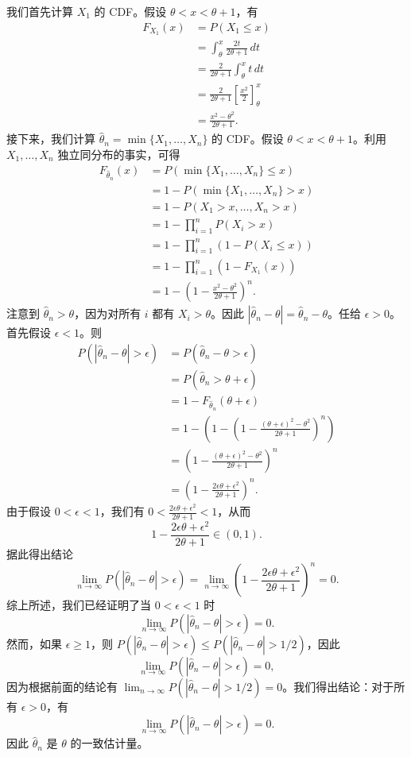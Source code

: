 \begin{questions}
\begin{solution}
我们首先计算 $X_1$ 的 CDF。假设 $\theta < x < \theta + 1$，有
\begin{align*}
F_{X_1}(x) &= P(X_1 \le x) \\
&= \int_{\theta}^x \frac{2t}{2\theta+1} \,dt \\
&= \frac{2}{2\theta+1} \int_{\theta}^x t \,dt \\
&= \frac{2}{2\theta+1} \left[\frac{x^2}{2}\right]_{\theta}^x \\
&= \frac{x^2 - \theta^2}{2\theta+1}.
\end{align*}
接下来，我们计算 $\hat{\theta}_n = \min\{X_1, \dots, X_n\}$ 的 CDF。假设 $\theta < x < \theta + 1$。利用 $X_1, \dots, X_n$ 独立同分布的事实，可得
\begin{align*}
F_{\hat{\theta}_n}(x) &= P(\min\{X_1, \dots, X_n\} \le x) \\
&= 1 - P(\min\{X_1, \dots, X_n\} > x) \\
&= 1 - P(X_1 > x, \dots, X_n > x) \\
&= 1 - \prod_{i=1}^n P(X_i > x) \\
&= 1 - \prod_{i=1}^n (1 - P(X_i \le x)) \\
&= 1 - \prod_{i=1}^n (1 - F_{X_1}(x)) \\
&= 1 - \left(1 - \frac{x^2 - \theta^2}{2\theta+1}\right)^n.
\end{align*}
注意到 $\hat{\theta}_n > \theta$，因为对所有 $i$ 都有 $X_i > \theta$。因此 $|\hat{\theta}_n - \theta| = \hat{\theta}_n - \theta$。任给 $\epsilon > 0$。首先假设 $\epsilon < 1$。则
\begin{align*}
P(|\hat{\theta}_n - \theta| > \epsilon) &= P(\hat{\theta}_n - \theta > \epsilon) \\
&= P(\hat{\theta}_n > \theta + \epsilon) \\
&= 1 - F_{\hat{\theta}_n}(\theta + \epsilon) \\
&= 1 - \left(1 - \left(1 - \frac{(\theta + \epsilon)^2 - \theta^2}{2\theta+1}\right)^n\right) \\
&= \left(1 - \frac{(\theta + \epsilon)^2 - \theta^2}{2\theta+1}\right)^n \\
&= \left(1 - \frac{2\epsilon\theta + \epsilon^2}{2\theta + 1}\right)^n.
\end{align*}
由于假设 $0 < \epsilon < 1$，我们有 $0 < \frac{2\epsilon\theta + \epsilon^2}{2\theta+1} < 1$，从而
\[
1 - \frac{2\epsilon\theta + \epsilon^2}{2\theta + 1} \in (0, 1).
\]
据此得出结论
\[
\lim_{n \to \infty} P(|\hat{\theta}_n - \theta| > \epsilon) = \lim_{n \to \infty} \left(1 - \frac{2\epsilon\theta + \epsilon^2}{2\theta + 1}\right)^n = 0.
\]
综上所述，我们已经证明了当 $0 < \epsilon < 1$ 时
\[
\lim_{n \to \infty} P(|\hat{\theta}_n - \theta| > \epsilon) = 0.
\]
然而，如果 $\epsilon \ge 1$，则 $P(|\hat{\theta}_n - \theta| > \epsilon) \le P(|\hat{\theta}_n - \theta| > 1/2)$，因此
\[
\lim_{n \to \infty} P(|\hat{\theta}_n - \theta| > \epsilon) = 0,
\]
因为根据前面的结论有 $\lim_{n \to \infty} P(|\hat{\theta}_n - \theta| > 1/2) = 0$。我们得出结论：对于所有 $\epsilon > 0$，有
\[
\lim_{n \to \infty} P(|\hat{\theta}_n - \theta| > \epsilon) = 0.
\]
因此 $\hat{\theta}_n$ 是 $\theta$ 的一致估计量。
\end{solution}


\end{questions}
